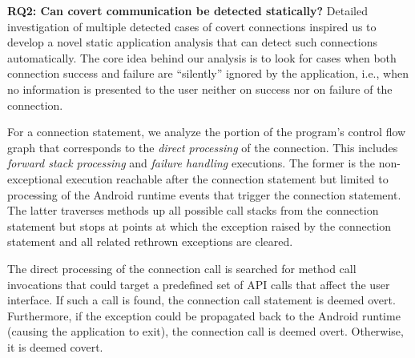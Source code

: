 \noindent 
{\bf RQ2: Can covert communication be detected statically?}
Detailed investigation of multiple detected cases of covert
connections inspired us to develop a novel static application analysis that
can detect such connections automatically.  The core idea behind our
analysis is to look for cases when both connection success and failure are ``silently'' ignored by the application, i.e., when no information is presented to the user neither on success nor on   failure of the connection. 

For a connection statement, we analyze the portion of the program's
control flow graph that corresponds to the \emph{direct processing} of
the connection.  This includes
\emph{forward stack processing} and \emph{failure handling}
executions.  The former is the non-exceptional execution reachable
after the connection statement but limited to processing of the
Android runtime events that trigger the connection statement.
The latter traverses methods up all possible call stacks from the
connection statement but stops at points at which the
exception raised by the connection statement and all related rethrown
exceptions are cleared.


%

The direct processing of the connection call is searched for method
call invocations that could target a predefined set of API calls that
affect the user interface.  If such a call is found, the connection
call statement is deemed overt.  Furthermore, if the exception
could be propagated back to the Android runtime (causing the
application to exit), the connection call is deemed overt.
Otherwise, it is deemed covert.


